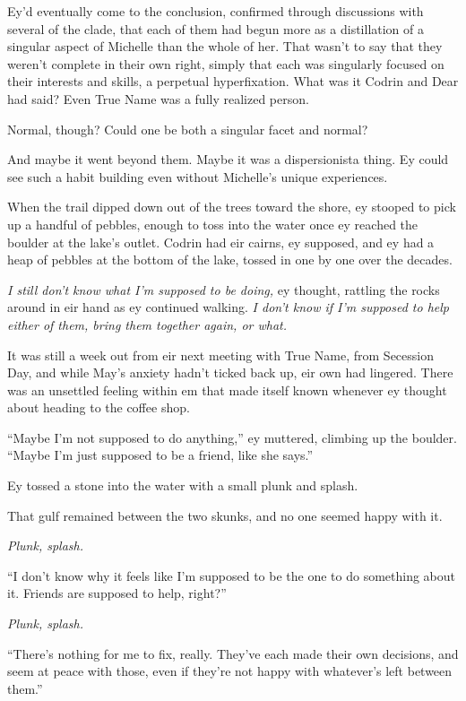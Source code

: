Ey'd eventually come to the conclusion, confirmed through discussions with several of the clade, that each of them had begun more as a distillation of a singular aspect of Michelle than the whole of her. That wasn't to say that they weren't complete in their own right, simply that each was singularly focused on their interests and skills, a perpetual hyperfixation. What was it Codrin and Dear had said? Even True Name was a fully realized person.

Normal, though? Could one be both a singular facet and normal?

And maybe it went beyond them. Maybe it was a dispersionista thing. Ey could see such a habit building even without Michelle's unique experiences.

When the trail dipped down out of the trees toward the shore, ey stooped to pick up a handful of pebbles, enough to toss into the water once ey reached the boulder at the lake's outlet. Codrin had eir cairns, ey supposed, and ey had a heap of pebbles at the bottom of the lake, tossed in one by one over the decades.

\emph{I still don't know what I'm supposed to be doing,} ey thought, rattling the rocks around in eir hand as ey continued walking. \emph{I don't know if I'm supposed to help either of them, bring them together again, or what.}

It was still a week out from eir next meeting with True Name, from Secession Day, and while May's anxiety hadn't ticked back up, eir own had lingered. There was an unsettled feeling within em that made itself known whenever ey thought about heading to the coffee shop.

``Maybe I'm not supposed to do anything,'' ey muttered, climbing up the boulder. ``Maybe I'm just supposed to be a friend, like she says.''

Ey tossed a stone into the water with a small plunk and splash.

That gulf remained between the two skunks, and no one seemed happy with it.

\emph{Plunk, splash.}

``I don't know why it feels like I'm supposed to be the one to do something about it. Friends are supposed to help, right?''

\emph{Plunk, splash.}

``There's nothing for me to fix, really. They've each made their own decisions, and seem at peace with those, even if they're not happy with whatever's left between them.''

